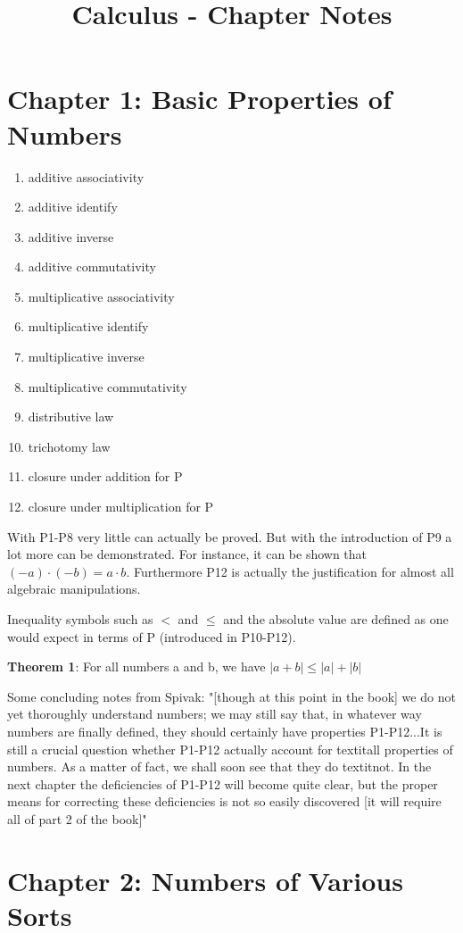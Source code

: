 \documentclass{article}
\begin{document}
\title{Calculus - Chapter Notes}
\author{}
\date{}
\maketitle

\section{Chapter 1: Basic Properties of Numbers}

\begin{enumerate}
	\item additive associativity
	\item additive identify
	\item additive inverse
	\item additive commutativity
	\item multiplicative associativity
	\item multiplicative identify
	\item multiplicative inverse
	\item multiplicative commutativity
	\item distributive law
	\item trichotomy law
	\item closure under addition for P
	\item closure under multiplication for P
\end{enumerate}

\begin{flushleft}
With P1-P8 very little can actually be proved. But with the introduction of P9 a lot more can be demonstrated. For instance, it can be shown that $(-a) \cdot (-b) = a \cdot b$. Furthermore P12 is actually the justification for almost all algebraic manipulations.
\end{flushleft}

\begin{flushleft}
Inequality symbols such as $<$ and $\leq$ and the absolute value are defined as one would expect in terms of P (introduced in P10-P12).
\end{flushleft}

\textbf{Theorem 1}: For all numbers a and b, we have $ |a+b| \leq |a|+|b| $

\begin{flushleft}
Some concluding notes from Spivak: "[though at this point in the book] we do not yet thoroughly understand numbers; we may still say that, in whatever way numbers are finally defined, they should certainly have properties P1-P12...It is still a crucial question whether P1-P12 actually account for textit{all} properties of numbers. As a matter of fact, we shall soon see that they do textit{not}. In the next chapter the deficiencies of P1-P12 will become quite clear, but the proper means for correcting these deficiencies is not so easily discovered [it will require all of part 2 of the book]"
\end{flushleft}

\section{Chapter 2: Numbers of Various Sorts}
\end{document}
